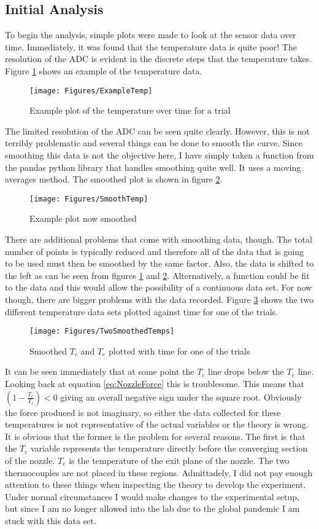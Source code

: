\subsection{Initial Analysis}
To begin the analysis, simple plots were made to look at the sensor data over time. Immediately, it was found that the temperature data is quite poor! The resolution of the ADC is evident in the discrete steps that the temperature takes. Figure \ref{fig:BadTemp} shows an example of the temperature data.
\begin{figure}[h!]
\centering
\texttt{[image: Figures/ExampleTemp]}
\caption{Example plot of the temperature over time for a trial}
\label{fig:BadTemp}
\end{figure}
The limited resolution of the ADC can be seen quite clearly. However, this is not terribly problematic and several things can be done to smooth the curve. Since smoothing this data is not the objective here, I have simply taken a function from the pandas python library that handles smoothing quite well. It uses a moving averages method. The smoothed plot is shown in figure \ref{fig:SmoothedTemp}.
\begin{figure}[h!]
\centering
\texttt{[image: Figures/SmoothTemp]}
\caption{Example plot now smoothed}
\label{fig:SmoothedTemp}
\end{figure}
There are additional problems that come with smoothing data, though. The total number of points is typically reduced and therefore all of the data that is going to be used must then be smoothed by the same factor. Also, the data is shifted to the left as can be seen from figures \ref{fig:BadTemp} and \ref{fig:SmoothedTemp}. Alternatively, a function could be fit to the data and this would allow the possibility of a continuous data set. For now though, there are bigger problems with the data recorded. Figure \ref{fig:BothTemps} shows the two different temperature data sets plotted against time for one of the trials. 
\begin{figure}[h!]
\centering
\texttt{[image: Figures/TwoSmoothedTemps]}
\caption{Smoothed $T_c$ and $T_e$ plotted with time for one of the trials}
\label{fig:BothTemps}
\end{figure}
It can be seen immediately that at some point the $T_c$ line drops below the $T_e$ line. Looking back at equation \ref{eq:NozzleForce} this is troublesome. This means that $\left(1-\frac{T_e}{T_c}\right)<0$ giving an overall negative sign under the square root. Obviously the force produced is not imaginary, so either the data collected for these temperatures is not representative of the actual variables or the theory is wrong. It is obvious that the former is the problem for several reasons. The first is that the $T_c$ variable represents the temperature directly before the converging section of the nozzle. $T_e$ is the temperature of the exit plane of the nozzle. The two thermocouples are not placed in these regions. Admittadely, I did not pay enough attention to these things when inspecting the theory to develop the experiment. Under normal circumstances I would make changes to the experimental setup, but since I am no longer allowed into the lab due to the global pandemic I am stuck with this data set. \\
